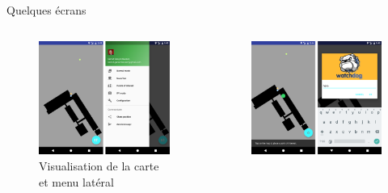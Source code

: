\documentclass{beamer} %
\begin{document}
  \begin{frame}[T]{\subsecname}
    \begin{center}
      Quelques écrans
    \end{center}


    \begin{columns}[T]
      \begin{column}{0.5\textwidth}
        \begin{figure}
          \includegraphics[width=\linewidth, height=\textheight, keepaspectratio]{screen2.png}
          \caption{Visualisation de la carte et menu latéral}
        \end{figure}
      \end{column}
      \begin{column}{0.50\textwidth}
        \begin{figure}
          \includegraphics[width=\linewidth, height=\textheight, keepaspectratio]{screen4.png}

\end{figure}
\end{column}
\end{columns}
\end{frame}
\end{document}
